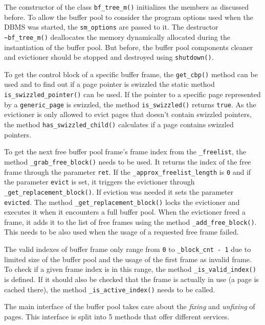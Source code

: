 	The constructor of the class \lstinline{bf_tree_m()} initializes the members as discussed before. To allow the buffer pool to consider the program options used when the DBMS was started, the \lstinline{sm_options} are passed to it. The destructor \lstinline{~bf_tree_m()} deallocates the memory dynamically allocated during the instantiation of the buffer pool. But before, the buffer pool components cleaner and evictioner should be stopped and destroyed using \lstinline{shutdown()}.
	
	To get the control block of a specific buffer frame, the \lstinline{get_cbp()} method can be used and to find out if a page pointer is swizzled the static method \lstinline{is_swizzled_pointer()} can be used. If the pointer to a specific page represented by a \lstinline{generic_page} is swizzled, the method \lstinline{is_swizzled()} returns \lstinline{true}. As the evictioner is only allowed to evict pages that doesn't contain swizzled pointers, the method \lstinline{has_swizzled_child()} calculates if a page contains swizzled pointers.
	
	To get the next free buffer pool frame's frame index from the \lstinline{_freelist}, the method \lstinline{_grab_free_block()} needs to be used. It returns the index of the free frame through the parameter \lstinline{ret}. If the \lstinline{_approx_freelist_length} is \lstinline{0} and if the parameter \lstinline{evict} is set, it triggers the evictioner through \lstinline{_get_replacement_block()}. If eviction was needed it sets the parameter \lstinline{evicted}. The method \lstinline{_get_replacement_block()} locks the evictioner and executes it when it encounters a full buffer pool. When the evictioner freed a frame, it adds it to the list of free frames using the method \lstinline{_add_free_block()}. This needs to be also used when the usage of a requested free frame failed.
	
	The valid indexes of buffer frame only range from \lstinline{0} to \lstinline{_block_cnt - 1} due to limited size of the buffer pool and the usage of the first frame as invalid frame. To check if a given frame index is in this range, the method \lstinline{_is_valid_index()} is defined. If it should also be checked that the frame is actually in use (a page is cached there), the method \lstinline{_is_active_index()} needs to be called.
	
	The main interface of the buffer pool takes care about the \emph{fixing} and \emph{unfixing} of pages. This interface is split into 5 methods that offer different services.
	
